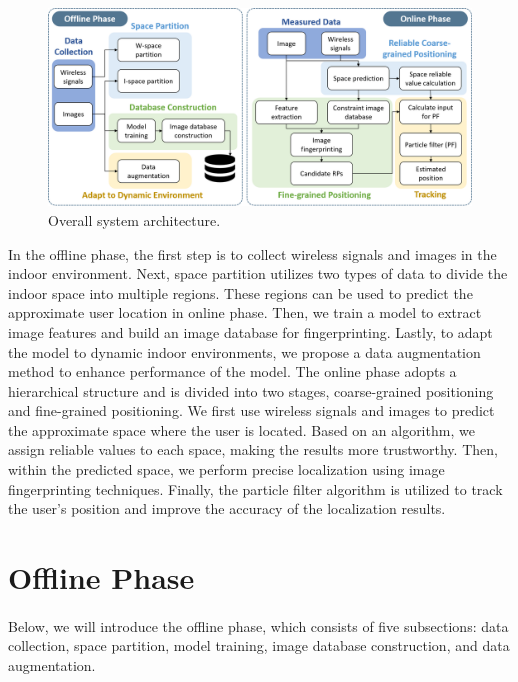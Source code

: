 \documentclass[a4paper,12pt]{report}
\begin{document}
\paragraph{}
\begin{figure}[h]
    \begin{center}
    \includegraphics[width=\columnwidth]{images/chap3/overall_sys_architecture.png}
    \caption{Overall system architecture.}
    \label{Fig:overall_system_architecture}
    \end{center}
\end{figure}
In the offline phase, the first step is to collect wireless signals and images in the indoor environment. Next, space partition utilizes two types of data to divide the indoor space into multiple regions. These regions can be used to predict the approximate user location in online phase. Then, we train a model to extract image features and build an image database for fingerprinting. Lastly, to adapt the model to dynamic indoor environments, we propose a data augmentation method to enhance performance of the model. The online phase adopts a hierarchical structure and is divided into two stages, coarse-grained positioning and fine-grained positioning. We first use wireless signals and images to predict the approximate space where the user is located. Based on an algorithm, we assign reliable values to each space, making the results more trustworthy. Then, within the predicted space, we perform precise localization using image fingerprinting techniques. Finally, the particle filter algorithm is utilized to track the user's position and improve the accuracy of the localization results.


\section{Offline Phase}
\paragraph{}
Below, we will introduce the offline phase, which consists of five subsections: data collection, space partition, model training, image database construction, and data augmentation.
\end{document}
